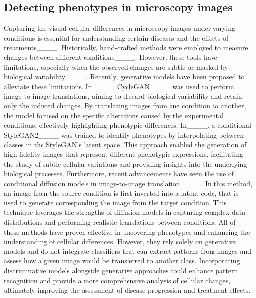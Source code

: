 \subsection{Detecting phenotypes in microscopy images}
Capturing the visual cellular differences in microscopy images under varying conditions is essential for understanding certain diseases and the effects of treatments____. Historically, hand-crafted methods were employed to measure changes between different conditions____. However, these tools have limitations, especially when the observed changes are subtle or masked by biological variability____. Recently, generative models have been proposed to alleviate these limitations. In____, CycleGAN____ was used to perform image-to-image translations, aiming to discard biological variability and retain only the induced changes. By translating images from one condition to another, the model focused on the specific alterations caused by the experimental conditions, effectively highlighting phenotypic differences. In____, a conditional StyleGAN2____ was trained to identify phenotypes by interpolating between classes in the StyleGAN's latent space. This approach enabled the generation of high-fidelity images that represent different phenotypic expressions, facilitating the study of subtle cellular variations and providing insights into the underlying biological processes. Furthermore, recent advancements have seen the use of conditional diffusion models in image-to-image translation____. In this method, an image from the source condition is first inverted into a latent code, that is used to generate corresponding the image from the target condition. This technique leverages the strengths of diffusion models in capturing complex data distributions and performing realistic translations between conditions. All of these methods have proven effective in uncovering phenotypes and enhancing the understanding of cellular differences. However, they rely solely on generative models and do not integrate classifiers that can extract patterns from images and assess how a given image would be transferred to another class. Incorporating discriminative models alongside generative approaches could enhance pattern recognition and provide a more comprehensive analysis of cellular changes, ultimately improving the assessment of disease progression and treatment effects.


